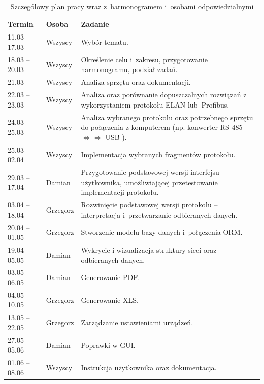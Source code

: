 \begin{table}[h]
\centering
\begin{tabular}{|p{}|p{}|p{}|}
\hline \textbf{Termin} & \textbf{Osoba} & \textbf{Zadanie} \\ 
\hline\hline 11.03 -- 17.03 & Wszyscy & Wybór tematu. \\ 
\hline 18.03 -- 20.03 & Wszyscy & Określenie celu i~zakresu, przygotowanie harmonogramu, podział zadań. \\ 
\hline 21.03 & Wszyscy & Analiza sprzętu oraz dokumentacji. \\ 
\hline 22.03 -- 23.03 & Wszyscy & Analiza oraz porównanie dopuszczalnych rozwiązań z wykorzystaniem protokołu ELAN lub~Profibus. \\ 
\hline 24.03 -- 25.03 & Wszyscy & Analiza wybranego protokołu oraz potrzebnego sprzętu do połączenia z komputerem (np. konwerter RS-485 $\Leftrightarrow\Leftrightarrow$ USB ). \\ 
\hline 25.03 -- 02.04 & Wszyscy & Implementacja wybranych fragmentów protokołu. \\ 
\hline 29.03 -- 17.04 & Damian & Przygotowanie podstawowej wersji interfejsu użytkownika, umożliwiającej przetestowanie implementacji protokołu. \\ 
\hline 03.04 -- 18.04 & Grzegorz & Rozwinięcie podstawowej wersji protokołu – interpretacja i~przetwarzanie odbieranych danych. \\ 
\hline 20.04 -- 01.05 & Grzegorz & Stworzenie modelu bazy danych i~połączenia ORM. \\ 
\hline 19.04 -- 05.05 & Damian & Wykrycie i wizualizacja struktury sieci oraz odbieranych danych. \\ 
\hline 03.05 -- 06.05 & Damian & Generowanie PDF. \\ 
\hline 04.05 -- 10.05 & Grzegorz  & Generowanie XLS. \\ 
\hline 13.05 -- 22.05 & Grzegorz & Zarządzanie ustawieniami urządzeń. \\ 
\hline 27.05 -- 05.06 & Damian & Poprawki w GUI. \\ 
\hline 01.06 -- 08.06 & Wszyscy & Instrukcja użytkownika oraz dokumentacja. \\ 
\hline 
\end{tabular} 
\caption{Szczegółowy plan pracy wraz z~harmonogramem i~osobami odpowiedzialnymi}
\label{tab:harmonogram}
\end{table}